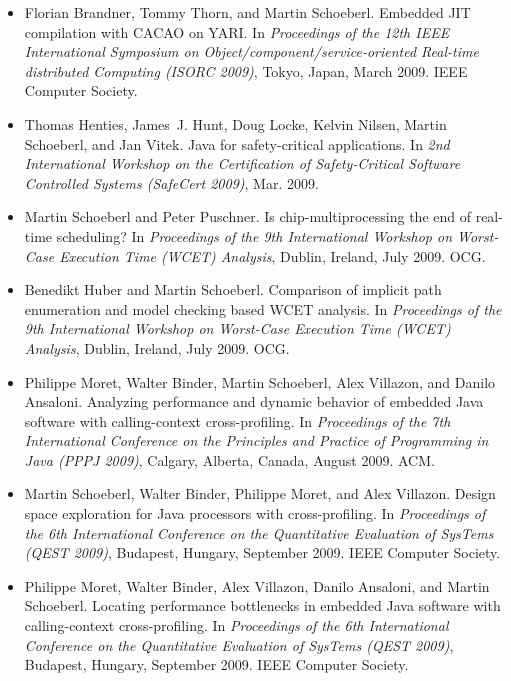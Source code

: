 \begin{itemize}
\item Florian Brandner, Tommy Thorn, and Martin Schoeberl.
    Embedded {JIT} compilation with {CACAO} on {YARI}. In {\em
    Proceedings of the 12th IEEE International Symposium on
    Object/component/service-oriented Real-time
  distributed Computing (ISORC 2009)}, Tokyo, Japan, March 2009.
  IEEE Computer Society.

\item Thomas Henties, James~J. Hunt, Doug Locke, Kelvin Nilsen,
    Martin Schoeberl, and Jan Vitek. Java for safety-critical
 applications. In {\em 2nd International Workshop on the
 Certification of Safety-Critical Software Controlled Systems
 (SafeCert 2009)}, Mar. 2009.

\item Martin Schoeberl and Peter Puschner. Is
    chip-multiprocessing the end of real-time scheduling? In {\em
    Proceedings of the 9th International Workshop on Worst-Case
  Execution Time (WCET) Analysis}, Dublin, Ireland, July 2009.
  OCG.

\item Benedikt Huber and Martin Schoeberl. Comparison of implicit
    path enumeration and model checking based WCET
  analysis. In {\em Proceedings of the 9th International Workshop
on Worst-Case
  Execution Time (WCET) Analysis}, Dublin, Ireland, July 2009.
  OCG.

\item Philippe Moret, Walter Binder, Martin Schoeberl, Alex
    Villazon, and Danilo Ansaloni. Analyzing performance and
dynamic behavior of embedded Java software with calling-context
  cross-profiling. In {\em Proceedings of
the 7th International Conference on the Principles and Practice
  of Programming in Java (PPPJ 2009)}, Calgary, Alberta, Canada,
  August 2009. ACM.

\item Martin Schoeberl, Walter Binder, Philippe Moret, and Alex
    Villazon. Design space exploration
for Java processors with cross-profiling. In {\em Proceedings of
the 6th International Conference on the Quantitative Evaluation
  of SysTems (QEST 2009)}, Budapest, Hungary, September 2009.
  IEEE Computer Society.

\item Philippe Moret, Walter Binder, Alex Villazon, Danilo
    Ansaloni, and Martin Schoeberl. Locating performance
    bottlenecks in embedded Java software with
  calling-context cross-profiling. In {\em Proceedings of the 6th
International Conference on the
  Quantitative Evaluation of SysTems (QEST 2009)}, Budapest,
  Hungary, September 2009. IEEE Computer Society.


\end{itemize}
